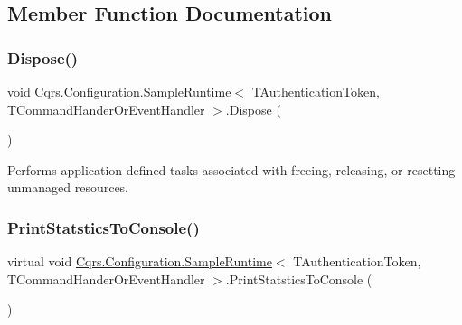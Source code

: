 \subsection{Member Function Documentation}
\mbox{\label{classCqrs_1_1Configuration_1_1SampleRuntime_ae3729c9e4d130fb2e0c88246d58dc761_ae3729c9e4d130fb2e0c88246d58dc761}} 
\subsubsection{\texorpdfstring{Dispose()}{Dispose()}}
{\footnotesize\ttfamily void \hyperlink{classCqrs_1_1Configuration_1_1SampleRuntime}{Cqrs.\+Configuration.\+Sample\+Runtime}$<$ T\+Authentication\+Token, T\+Command\+Hander\+Or\+Event\+Handler $>$.Dispose (\begin{DoxyParamCaption}{ }\end{DoxyParamCaption})}



Performs application-\/defined tasks associated with freeing, releasing, or resetting unmanaged resources. 

\mbox{\label{classCqrs_1_1Configuration_1_1SampleRuntime_a058cc1b64ffab9b1f2d0a4ca196a17ab_a058cc1b64ffab9b1f2d0a4ca196a17ab}} 
\subsubsection{\texorpdfstring{Print\+Statstics\+To\+Console()}{PrintStatsticsToConsole()}}
{\footnotesize\ttfamily virtual void \hyperlink{classCqrs_1_1Configuration_1_1SampleRuntime}{Cqrs.\+Configuration.\+Sample\+Runtime}$<$ T\+Authentication\+Token, T\+Command\+Hander\+Or\+Event\+Handler $>$.Print\+Statstics\+To\+Console (\begin{DoxyParamCaption}{ }\end{DoxyParamCaption})\hspace{0.3cm}{\ttfamily [virtual]}}




